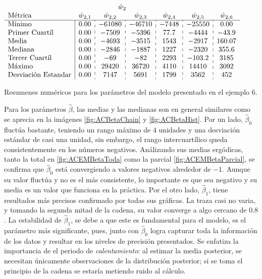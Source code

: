 \documentclass[../Main/Main.tex]{subfiles}
\begin{document}
\begin{table}[h]
\begin{subtable}{\textwidth}
		$\begin{array}{l|c:c:c:c:c:c}
		\multicolumn{7}{c}{\hat{w}_2} \\
		\text{Métrica} & \hat{w}_{2,1} & \hat{w}_{2,2} & \hat{w}_{2,3} & \hat{w}_{2,4} & \hat{w}_{2,5} & \hat{w}_{2,6} \\
        \hline                    
		\text{Mínimo} 			& 0.00 & -61080 &  -46710	&  -7448 &	-25550  &  0.00 \\
		\text{Primer Cuartíl} 	& 0.00 &  -7509 &  -5396	&  77.7	 &	-4444   &  -43.9 \\
		\text{Media} 			& 0.00 &  -4693 &  -3515	&  1543  &	-2917   &  160.07 \\
		\text{Mediana} 			& 0.00 &  -2846 &  -1887	&  1227  &	-2320   &  355.6 \\
		\text{Tercer Cuartíl} 	& 0.00 &    -69 &    -82	&  2293  &	-103.2  &  3185 \\
		\text{Máximo} 			& 0.00 &  29420 &  36720	&  4110  &	14410   &  3092 \\
		\text{Desviación Estandar} & 0.00 &   7147 &   5691	&  1799  &	3562    &  452 
		\end{array}$
	\end{subtable}
	\caption{Resumenes numéricos para los parámetros del modelo presentado en el ejemplo 6.}
	\label{tab:ParametrosConv}
\end{table}

Para los parámetros $\hat{\beta}$, las medias y las medianas son en general similares como se aprecia en la imágenes \ref{fig:ACBetaChain} y \ref{fig:ACBetaHist}. Por un lado, $\hat{\beta}_0$ fluctúa bastante, teniendo un rango máximo de 4 unidades y una desviación estándar de casi una unidad, sin embargo, el rango intercuartílico queda consistentemente en los números negativos. Análizando sus medias ergódicas, tanto la total en  \ref{fig:ACEMBetaToda} como la parcial \ref{fig:ACEMBetaParcial}, se confirma que $\hat{\beta}_0$ está convergiendo a valores negativos alrededor de $-1$. Aunque su valor fluctúa y no es el más consistente, lo importante es que sea negativo y su media es un valor que funciona en la práctica. Por el otro lado, $\hat{\beta}_1$, tiene resultados más precisos confirmado por todas sus gráficas. La traza casi no varia, y tomando la segunda mitad de la cadena, su valor converge a algo cercano de $0.8$. La estabilidad de $\hat{\beta}_1$, se debe a que este es fundamental para el modelo, es el parámetro más significante, pues, junto con $\hat{\beta}_0$ logra capturar toda la información de los datos y resultar en los niveles de precisión presentados. Se enfatiza la importancia de el periodo de \textit{calentamiento}: al estimar la media posterior, se necesitan únicamente observaciones de la distribución posterior; si se toma el principio de la cadena se estaría metiendo ruido al cálculo.
\end{document}
